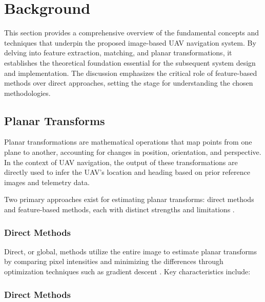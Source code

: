 
\section{Background}

This section provides a comprehensive overview of the fundamental concepts and techniques that underpin the proposed image-based UAV navigation system. By delving into feature extraction, matching, and planar transformations, it establishes the theoretical foundation essential for the subsequent system design and implementation. The discussion emphasizes the critical role of feature-based methods over direct approaches, setting the stage for understanding the chosen methodologies.




\subsection{Planar Transforms}

Planar transformations are mathematical operations that map points from one plane to another, accounting for changes in position, orientation, and perspective. In the context of UAV navigation, the output of these transformations are directly used to infer the UAV's location and heading based on prior reference images and telemetry data.

Two primary approaches exist for estimating planar transforms: direct methods and feature-based methods, each with distinct strengths and limitations \cite{nguyen2018}. 
\subsubsection{Direct Methods}

Direct, or global, methods utilize the entire image to estimate planar transforms by comparing pixel intensities and minimizing the differences through optimization techniques such as gradient descent \cite{nguyen2018}. Key characteristics include:

\subsubsection{Direct Methods}

